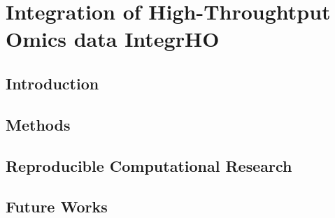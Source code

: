 \documentclass[b5paper,oneside,british,intoc,bibliograph=totoc,index=totoc,BCOR10mm,twoside,openright]{book}
\numberwithin{equation}{section}
\numberwithin{figure}{section}
\begin{document}

\chapter{Integration of High-Throughtput Omics data \newline IntegrHO} \label{sec:integrhocap}

\section{Introduction} \label{sec:integrhointro}

\section{Methods}  \label{sec:integrhometh}

\section{Reproducible Computational Research} \label{sec:integrhorr}

\section{Future Works} \label{sec:integrhofuture}


%
%
%
%
%
%
\end{document}

